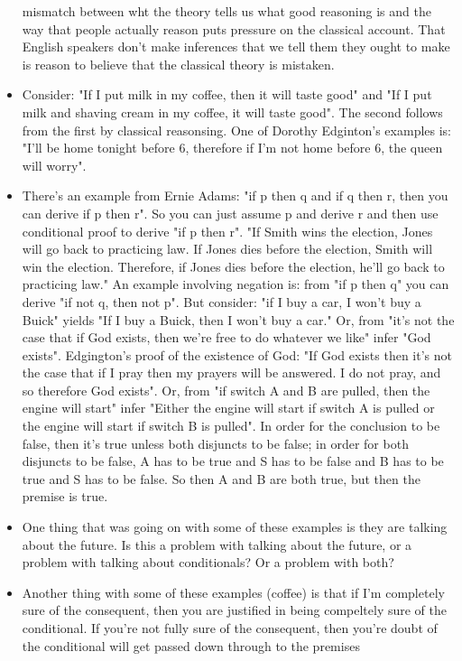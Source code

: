 \documentclass[12pt]{article}
\theoremstyle{definition}
\begin{document}
\begin{itemize}
mismatch between wht the theory tells us what good reasoning is and the way
that people actually reason puts pressure on the classical account. That
English speakers don't make inferences that we tell them they ought to make is
reason to believe that the classical theory is mistaken.
\item Consider: "If I put milk in my coffee, then it will taste good" and "If I
put milk and shaving cream in my coffee, it will taste good". The second
follows from the first by classical reasonsing. One of Dorothy Edginton's
examples is: "I'll be home tonight before 6, therefore if I'm not home before
6, the queen will worry". 
\item There's an example from Ernie Adams: "if p then q and if q then r, then
you can derive if p then r". So you can just assume p and derive r and then use
conditional proof to derive "if p then r". "If Smith wins the election, Jones
will go back to practicing law. If Jones dies before the election, Smith will
win the election. Therefore, if Jones dies before the election, he'll go back
to practicing law." An example involving negation is: from "if p then q" you
can derive "if not q, then not p". But consider: "if I buy a car, I won't buy a
Buick" yields "If I buy a Buick, then I won't buy a car." Or, from "it's not
the case that if God exists, then we're free to do whatever we like" infer "God
exists". Edgington's proof of the existence of God: "If God exists then it's
not the case that if I pray then my prayers will be answered. I do not pray,
and so therefore God exists". Or, from "if switch A and B are pulled, then the
engine will start" infer "Either the engine will start if switch A is pulled or
the engine will start if switch B is pulled". In order for the conclusion to be
false, then it's true unless both disjuncts to be false; in order for both
disjuncts to be false, A has to be true and S has to be false and B has to be
true and S has to be false. So then A and B are both true, but then the premise
is true.
\item One thing that was going on with some of these examples is they are
talking about the future. Is this a problem with talking about the future, or a
problem with talking about conditionals? Or a problem with both?
\item Another thing with some of these examples (coffee) is that if I'm
completely sure of the consequent, then you are justified in being compeltely
sure of the conditional. If you're not fully sure of the consequent, then
you're doubt of the conditional will get passed down through to the premises

\end{itemize}
\end{document}
